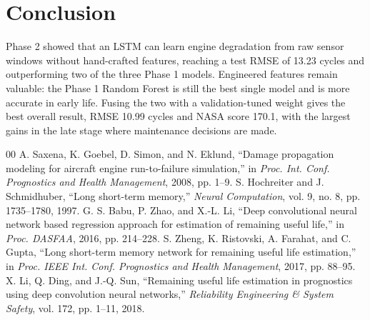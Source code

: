 \documentclass[conference]{IEEEtran}
\begin{document}
\section{Conclusion}
Phase 2 showed that an LSTM can learn engine degradation from raw sensor windows without hand-crafted features, reaching a test RMSE of 13.23 cycles and outperforming two of the three Phase 1 models. Engineered features remain valuable: the Phase 1 Random Forest is still the best single model and is more accurate in early life. Fusing the two with a validation-tuned weight gives the best overall result, RMSE 10.99 cycles and NASA score 170.1, with the largest gains in the late stage where maintenance decisions are made.


\begin{thebibliography}{00}
 A. Saxena, K. Goebel, D. Simon, and N. Eklund, ``Damage propagation modeling for aircraft engine run-to-failure simulation,'' in \textit{Proc. Int. Conf. Prognostics and Health Management}, 2008, pp. 1--9.
 S. Hochreiter and J. Schmidhuber, ``Long short-term memory,'' \textit{Neural Computation}, vol. 9, no. 8, pp. 1735--1780, 1997.
 G. S. Babu, P. Zhao, and X.-L. Li, ``Deep convolutional neural network based regression approach for estimation of remaining useful life,'' in \textit{Proc. DASFAA}, 2016, pp. 214--228.
 S. Zheng, K. Ristovski, A. Farahat, and C. Gupta, ``Long short-term memory network for remaining useful life estimation,'' in \textit{Proc. IEEE Int. Conf. Prognostics and Health Management}, 2017, pp. 88--95.
 X. Li, Q. Ding, and J.-Q. Sun, ``Remaining useful life estimation in prognostics using deep convolution neural networks,'' \textit{Reliability Engineering \& System Safety}, vol. 172, pp. 1--11, 2018.
\end{thebibliography}
\end{document}
